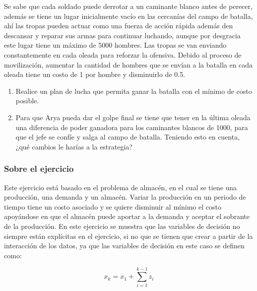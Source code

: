 \documentclass[a4paper,10pt,twocolumn]{article}
\theoremstyle{theorem}
\theoremstyle{definition}
\theoremstyle{remark}
\begin{document}
Se sabe que cada soldado puede derrotar a un caminante blanco antes de perecer, además se tiene un lugar inicialmente vacío en las cercanías del campo de batalla, ahí las tropas pueden actuar como una fuerza de acción rápida además den descansar y reparar sus armas para continuar luchando, aunque por desgracia este lugar tiene un máximo de 5000 hombres. Las tropas se van enviando constantemente en cada oleada para reforzar la ofensiva. Debido al proceso de movilización, aumentar la cantidad de hombres que se envían a la batalla en cada oleada tiene un costo de 1 por hombre y disminuirlo de 0.5.

\renewcommand{\theenumi}{\alph{enumi}} %

\begin{enumerate}

	\item Realice un plan de lucha que permita ganar la batalla con el mínimo de costo posible.
	\item Para que Arya pueda dar el golpe final se tiene que tener en la última oleada una diferencia de poder ganadora para los caminantes 
	blancos de 1000, para que el jefe se confíe y salga al campo de batalla. Teniendo esto en cuenta, ¿qué cambios le harías a la estrategia?

\end{enumerate}

		\subsubsection{Sobre el ejercicio}\label{subsubsec:sobre_ejer_5}

Este ejercicio está basado en el problema de almacén, en el cual se tiene una producción, una demanda y un almacén. Variar la producción en un periodo de tiempo tiene un costo asociado y se quiere disminuir al mínimo el costo apoyándose en que el almacén puede aportar a la demanda y aceptar el sobrante de la producción. En este ejercicio se muestra que las variables de decisión no siempre están explícitas en el ejercicio, si no que se tienen que crear a partir de la interacción de los datos, ya que las variables de decisión en este caso se definen como:

$$
x_k = x_1 + \sum_{i=1}^{k-1}z_i
$$
\end{document}
